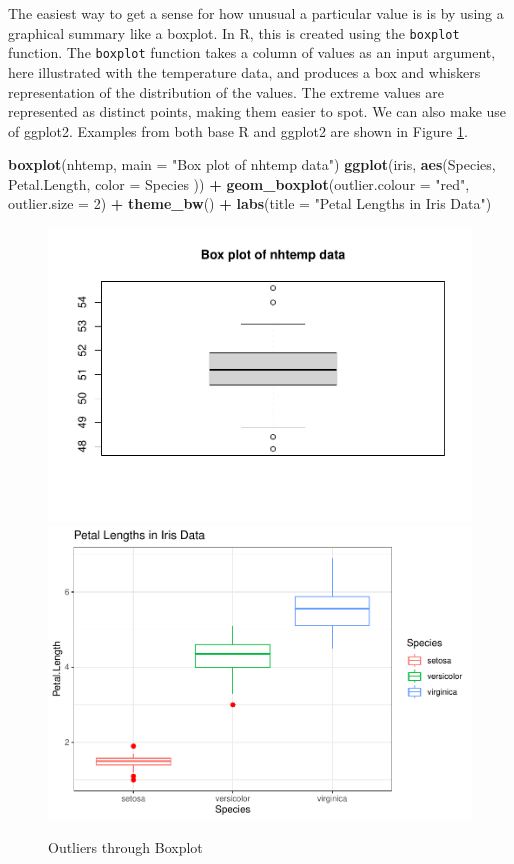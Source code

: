 \documentclass[
]{book}
\newenvironment{Shaded}{\begin{snugshade}}{\end{snugshade}}
\newcommand{\AttributeTok}[1]{\textcolor[rgb]{0.13,0.29,0.53}{#1}}
\newcommand{\DecValTok}[1]{\textcolor[rgb]{0.00,0.00,0.81}{#1}}
\newcommand{\FunctionTok}[1]{\textcolor[rgb]{0.13,0.29,0.53}{\textbf{#1}}}
\newcommand{\NormalTok}[1]{#1}
\newcommand{\SpecialCharTok}[1]{\textcolor[rgb]{0.81,0.36,0.00}{\textbf{#1}}}
\newcommand{\StringTok}[1]{\textcolor[rgb]{0.31,0.60,0.02}{#1}}
\begin{document}
The easiest way to get a sense for how unusual a particular value is is by using a graphical summary like a boxplot. In R, this is created using the \texttt{boxplot} function. The \texttt{boxplot} function takes a column of values as an input argument, here illustrated with the temperature data, and produces a box and whiskers representation of the distribution of the values. The extreme values are represented as distinct points, making them easier to spot. We can also make use of ggplot2. Examples from both base R and ggplot2 are shown in Figure \ref{fig:an1}.

\begin{Shaded}
\begin{Highlighting}[]
\FunctionTok{boxplot}\NormalTok{(nhtemp, }\AttributeTok{main =} \StringTok{"Box plot of nhtemp data"}\NormalTok{)}
\FunctionTok{ggplot}\NormalTok{(iris, }\FunctionTok{aes}\NormalTok{(Species, Petal.Length, }\AttributeTok{color =}\NormalTok{ Species )) }\SpecialCharTok{+}
  \FunctionTok{geom\_boxplot}\NormalTok{(}\AttributeTok{outlier.colour =} \StringTok{"red"}\NormalTok{, }\AttributeTok{outlier.size =} \DecValTok{2}\NormalTok{) }\SpecialCharTok{+}
  \FunctionTok{theme\_bw}\NormalTok{() }\SpecialCharTok{+}
  \FunctionTok{labs}\NormalTok{(}\AttributeTok{title =} \StringTok{"Petal Lengths in Iris Data"}\NormalTok{)}
\end{Highlighting}
\end{Shaded}

\begin{figure}

{\centering \includegraphics[width=0.45\linewidth]{DauR_files/figure-latex/an1-1} \includegraphics[width=0.45\linewidth]{DauR_files/figure-latex/an1-2} 

}

\caption{Outliers through Boxplot}\label{fig:an1}
\end{figure}
\end{document}
